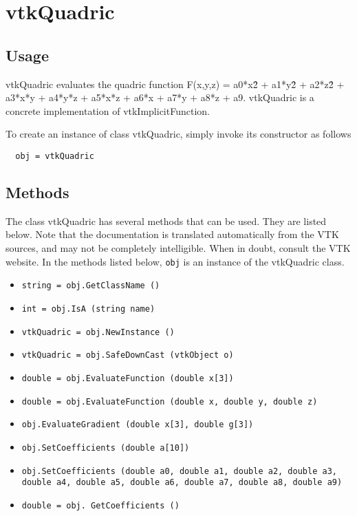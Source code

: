\section{vtkQuadric}

\subsection{Usage}

 vtkQuadric evaluates the quadric function F(x,y,z) = a0*x\^2 + a1*y\^2 + 
 a2*z\^2 + a3*x*y + a4*y*z + a5*x*z + a6*x + a7*y + a8*z + a9. vtkQuadric is
 a concrete implementation of vtkImplicitFunction.

To create an instance of class vtkQuadric, simply
invoke its constructor as follows
\begin{verbatim}
  obj = vtkQuadric
\end{verbatim}
\subsection{Methods}

The class vtkQuadric has several methods that can be used.
  They are listed below.
Note that the documentation is translated automatically from the VTK sources,
and may not be completely intelligible.  When in doubt, consult the VTK website.
In the methods listed below, \verb|obj| is an instance of the vtkQuadric class.
\begin{itemize}
\item  \verb|string = obj.GetClassName ()|

\item  \verb|int = obj.IsA (string name)|

\item  \verb|vtkQuadric = obj.NewInstance ()|

\item  \verb|vtkQuadric = obj.SafeDownCast (vtkObject o)|

\item  \verb|double = obj.EvaluateFunction (double x[3])|

\item  \verb|double = obj.EvaluateFunction (double x, double y, double z)|

\item  \verb|obj.EvaluateGradient (double x[3], double g[3])|

\item  \verb|obj.SetCoefficients (double a[10])|

\item  \verb|obj.SetCoefficients (double a0, double a1, double a2, double a3, double a4, double a5, double a6, double a7, double a8, double a9)|

\item  \verb|double = obj. GetCoefficients ()|

\end{itemize}
